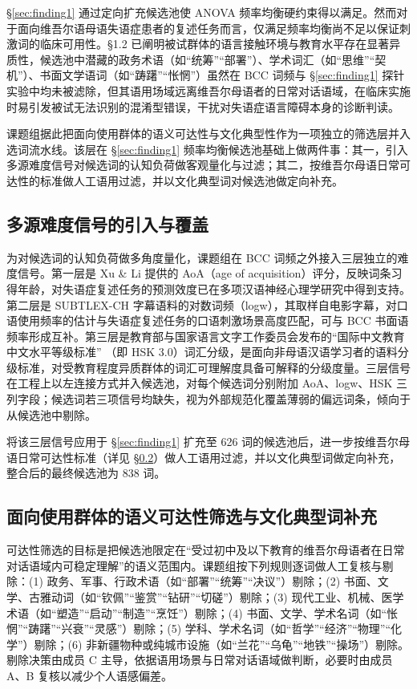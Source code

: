 \documentclass[12pt, a4paper]{article}
\begin{document}
\S\ref{sec:finding1} 通过定向扩充候选池使 ANOVA 频率均衡硬约束得以满足。然而对于面向维吾尔语母语失语症患者的复述任务而言，仅满足频率均衡尚不足以保证刺激词的临床可用性。\S 1.2 已阐明被试群体的语言接触环境与教育水平存在显著异质性，候选池中潜藏的政务术语（如“统筹”“部署”）、学术词汇（如“思维”“契机”）、书面文学语词（如“踌躇”“怅惘”）虽然在 BCC 词频与 \S\ref{sec:finding1} 探针实验中均未被滤除，但其语用场域远离维吾尔母语者的日常对话语域，在临床实施时易引发被试无法识别的混淆型错误，干扰对失语症语言障碍本身的诊断判读。

课题组据此把面向使用群体的语义可达性与文化典型性作为一项独立的筛选层并入选词流水线。该层在 \S\ref{sec:finding1} 频率均衡候选池基础上做两件事：其一，引入多源难度信号对候选词的认知负荷做客观量化与过滤；其二，按维吾尔母语日常可达性的标准做人工语用过滤，并以文化典型词对候选池做定向补充。

\subsection{多源难度信号的引入与覆盖}

为对候选词的认知负荷做多角度量化，课题组在 BCC 词频之外接入三层独立的难度信号。第一层是 Xu \& Li \cite{xu2020concreteness} 提供的 AoA（age of acquisition）评分，反映词条习得年龄，对失语症复述任务的预测效度已在多项汉语神经心理学研究中得到支持。第二层是 SUBTLEX-CH \cite{cai2010subtlex} 字幕语料的对数词频（logw），其取样自电影字幕，对口语使用频率的估计与失语症复述任务的口语刺激场景高度匹配，可与 BCC 书面语频率形成互补。第三层是教育部与国家语言文字工作委员会发布的“国际中文教育中文水平等级标准” \cite{hsk2021}（即 HSK 3.0）词汇分级，是面向非母语汉语学习者的语料分级标准，对受教育程度异质群体的词汇可理解度具备可解释的分级度量。三层信号在工程上以左连接方式并入候选池，对每个候选词分别附加 AoA、logw、HSK 三列字段；候选词若三项信号均缺失，视为外部规范化覆盖薄弱的偏远词条，倾向于从候选池中剔除。

将该三层信号应用于 \S\ref{sec:finding1} 扩充至 626 词的候选池后，进一步按维吾尔母语日常可达性标准（详见 \S\ref{subsec:reachability}）做人工语用过滤，并以文化典型词做定向补充，整合后的最终候选池为 838 词。

\subsection{面向使用群体的语义可达性筛选与文化典型词补充}
\label{subsec:reachability}

可达性筛选的目标是把候选池限定在“受过初中及以下教育的维吾尔母语者在日常对话语域内可稳定理解”的语义范围内。课题组按下列规则逐词做人工复核与剔除：(1) 政务、军事、行政术语（如“部署”“统筹”“决议”）剔除；(2) 书面、文学、古雅动词（如“钦佩”“鉴赏”“钻研”“切磋”）剔除；(3) 现代工业、机械、医学术语（如“塑造”“启动”“制造”“烹饪”）剔除；(4) 书面、文学、学术名词（如“怅惘”“踌躇”“兴衰”“灵感”）剔除；(5) 学科、学术名词（如“哲学”“经济”“物理”“化学”）剔除；(6) 非新疆物种或纯城市设施（如“兰花”“乌龟”“地铁”“操场”）剔除。剔除决策由成员 C 主导，依据语用场景与日常对话语域做判断，必要时由成员 A、B 复核以减少个人语感偏差。
\end{document}
